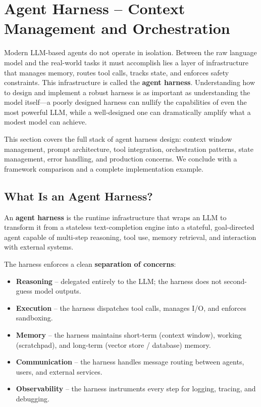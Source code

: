\chapter{Agent Harness -- Context Management and Orchestration}
\label{sec:agent-harness}

Modern LLM-based agents do not operate in isolation. Between the raw language model and the real-world tasks it must accomplish lies a layer of infrastructure that manages memory, routes tool calls, tracks state, and enforces safety constraints. This infrastructure is called the \textbf{agent harness}. Understanding how to design and implement a robust harness is as important as understanding the model itself---a poorly designed harness can nullify the capabilities of even the most powerful LLM, while a well-designed one can dramatically amplify what a modest model can achieve.

This section covers the full stack of agent harness design: context window management, prompt architecture, tool integration, orchestration patterns, state management, error handling, and production concerns. We conclude with a framework comparison and a complete implementation example.

\section{What Is an Agent Harness?}
\label{subsec:what-is-harness}

\begin{keybox}
An \textbf{agent harness} is the runtime infrastructure that wraps an LLM to transform it from a stateless text-completion engine into a stateful, goal-directed agent capable of multi-step reasoning, tool use, memory retrieval, and interaction with external systems.
\end{keybox}

The harness enforces a clean \textbf{separation of concerns}:

\begin{itemize}
  \item \textbf{Reasoning} -- delegated entirely to the LLM; the harness does not second-guess model outputs.
  \item \textbf{Execution} -- the harness dispatches tool calls, manages I/O, and enforces sandboxing.
  \item \textbf{Memory} -- the harness maintains short-term (context window), working (scratchpad), and long-term (vector store / database) memory.
  \item \textbf{Communication} -- the harness handles message routing between agents, users, and external services.
  \item \textbf{Observability} -- the harness instruments every step for logging, tracing, and debugging.
\end{itemize}

